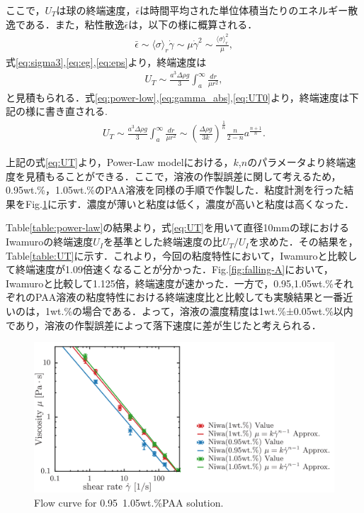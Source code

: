 ここで，$U_T$は球の終端速度，$\bar{\epsilon}$は時間平均された単位体積当たりのエネルギー散逸である．また，粘性散逸$\bar{\epsilon}$は，以下の様に概算される．
\begin{eqnarray}
    \bar{\epsilon} \sim \langle\sigma\rangle_r\dot{\gamma} \sim \mu \dot{\gamma}^2 \sim \frac{\langle\sigma\rangle_r^2}{\mu} ,
    \label{eq:eps}
\end{eqnarray}
式\ref{eq:sigma3},\ref{eq:eg},\ref{eq:eps}より，終端速度は
\begin{eqnarray}
    U_T \sim \frac{a^3\Delta\rho g}{3}\int_a^\infty\frac{dr}{\mu r^2} ,
    \label{eq:UT0}
\end{eqnarray}
と見積もられる．式\ref{eq:power-low},\ref{eq:gamma_abs},\ref{eq:UT0}より，終端速度は下記の様に書き直される.
\begin{eqnarray}
    U_T \sim \frac{a^3\Delta\rho g}{3}  \int^{\infty}_{a} \frac{dr}{\mu r^2} \sim \left(\frac{\Delta \rho g}{3k}\right)^{\frac{1}{n}}\frac{n}{2-n}a^{\frac{n+1}{n}} .
    \label{eq:UT}
\end{eqnarray}

上記の式\ref{eq:UT}より，Power-Law modelにおける，$k$,$n$のパラメータより終端速度を見積もることができる．ここで，溶液の作製誤差に関して考えるため，0.95wt.\%，1.05wt.\%のPAA溶液を同様の手順で作製した．粘度計測を行った結果をFig.\ref{fig:95-105}に示す．濃度が薄いと粘度は低く，濃度が高いと粘度は高くなった．

Table\ref{table:power-law}の結果より，式\ref{eq:UT}を用いて直径10mmの球におけるIwamuro\cite{ref:8}の終端速度$U_I$を基準とした終端速度の比$U_T/U_{I}$を求めた．その結果を，Table\ref{table:UT}に示す．これより，今回の粘度特性において，Iwamuro\cite{ref:8}と比較して終端速度が1.09倍速くなることが分かった．Fig.\ref{fig:falling-A}において，Iwamuro\cite{ref:8}と比較して1.125倍，終端速度が速かった．一方で，0.95,1.05wt.\%それぞれのPAA溶液の粘度特性における終端速度比と比較しても実験結果と一番近いのは，1wt.\%の場合である．よって，溶液の濃度精度は1wt.\%±0.05wt.\%以内であり，溶液の作製誤差によって落下速度に差が生じたと考えられる．

\begin{figure}[ht]
    \includegraphics[width=15cm,clip]{5-Discussion/95-105.png}
    \caption{Flow curve for 0.95~1.05wt.\%PAA solution.}
    \label{fig:95-105}
\end{figure}

